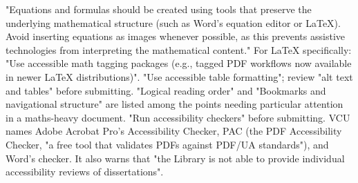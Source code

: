 	{"Equations and formulas should be created using tools that preserve the
	 underlying mathematical structure (such as Word's equation editor or
	 LaTeX). Avoid inserting equations as images whenever possible, as this
	 prevents assistive technologies from interpreting the mathematical
	 content." For LaTeX specifically: "Use accessible math tagging packages
	 (e.g., tagged PDF workflows now available in newer LaTeX distributions)".}
	{"Use accessible table formatting"; review "alt text and tables" before
	 submitting.}
	{"Logical reading order" and "Bookmarks and navigational structure" are
	 listed among the points needing particular attention in a maths-heavy
	 document.}
	{"Run accessibility checkers" before submitting. VCU names Adobe Acrobat
	 Pro's Accessibility Checker, PAC (the PDF Accessibility Checker, "a free
	 tool that validates PDFs against PDF/UA standards"), and Word's checker. It
	 also warns that "the Library is not able to provide individual
	 accessibility reviews of dissertations".}

%
%
%
%
%
\newcommand{\thesis@vcu@priordegrees}{}
\newcommand{\vcupriordegrees}[1]{\renewcommand{\thesis@vcu@priordegrees}{#1}}

